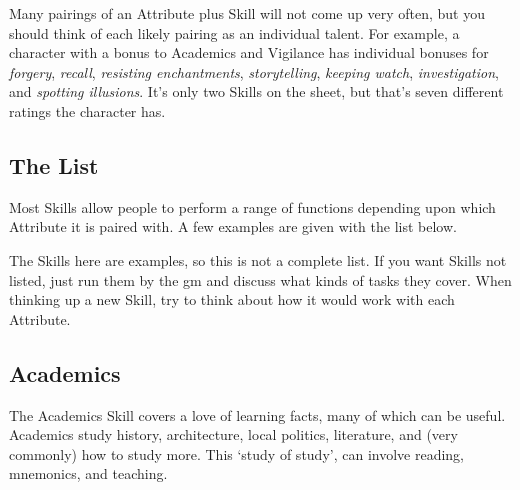 \begin{multicols}{2}
Many pairings of an Attribute plus Skill will not come up very often, but you should think of each likely pairing as an individual talent.
For example, a character with a bonus to Academics and Vigilance has individual bonuses for \textit{forgery}, \textit{recall}, \textit{resisting enchantments}, \textit{storytelling}, \textit{keeping watch}, \textit{investigation}, and \textit{spotting illusions}.
It's only two Skills on the sheet, but that's seven different ratings the character has.

\subsection{The List}
\label{skills}

Most Skills allow people to perform a range of functions depending upon which Attribute it is paired with. A few examples are given with the list below.

The Skills here are examples, so this is not a complete list.
If you want Skills not listed, just run them by the \gls{gm} and discuss what kinds of tasks they cover.
When thinking up a new Skill, try to think about how it would work with each Attribute.

\subsection{Academics}

The Academics Skill covers a love of learning facts, many of which can be useful.
Academics study history, architecture, local politics, literature, and (very commonly) how to study more.
This `study of study', can involve reading, mnemonics, and teaching.

\end{multicols}
